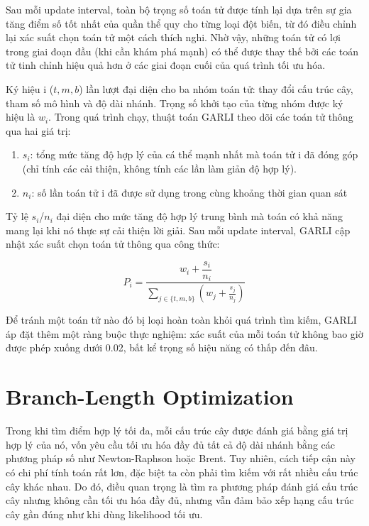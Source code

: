 \documentclass[12pt,a4paper]{report}
\begin{document}
Sau mỗi update interval, toàn bộ trọng số toán tử được tính lại dựa trên sự gia tăng điểm số tốt nhất của quần thể quy cho từng loại đột biến, từ đó điều chỉnh lại xác suất chọn toán tử một cách thích nghi. Nhờ vậy, những toán tử có lợi trong giai đoạn đầu (khi cần khám phá mạnh) có thể được thay thế bởi các toán tử tinh chỉnh hiệu quả hơn ở các giai đoạn cuối của quá trình tối ưu hóa.

Ký hiệu i \in (\(t, m, b\)) lần lượt đại diện cho ba nhóm toán tử: thay đổi cấu trúc cây, tham số mô hình và độ dài nhánh. Trọng số khởi tạo của từng nhóm được ký hiệu là \(w_i\). Trong quá trình chạy, thuật toán GARLI theo dõi các toán tử thông qua hai giá trị:

\begin{enumerate}
    \item \(s_i\): tổng mức tăng độ hợp lý của cá thể mạnh nhất mà toán tử i đã đóng góp (chỉ tính các cải thiện, không tính các lần làm giản độ hợp lý).
    \item \(n_i\): số lần toán tử i đã được sử dụng trong cùng khoảng thời gian quan sát
\end{enumerate}
 
Tỷ lệ \(s_i\)/\(n_i\) đại diện cho mức tăng độ hợp lý trung bình mà toán có khả năng mang lại khi nó thực sự cải thiện lời giải. Sau mỗi update interval, GARLI cập nhật xác suất chọn toán tử thông qua công thức:

\begin{equation}
    P_i = \frac{w_i + \dfrac{s_i}{n_i}}{\displaystyle \sum_{j \in \{t,m,b\}} \left( w_j + \frac{s_j}{n_j} \right)}
    \label{eq:placeholder_label}
\end{equation}

Để tránh một toán tử nào đó bị loại hoàn toàn khỏi quá trình tìm kiếm, GARLI áp đặt thêm một ràng buộc thực nghiệm: xác suất của mỗi toán tử không bao giờ được phép xuống dưới 0.02, bất kể trọng số hiệu năng có thấp đến đâu.

\section{Branch-Length Optimization}

Trong khi tìm điểm hợp lý tối đa, mỗi cấu trúc cây được đánh giá bằng giá trị hợp lý của nó, vốn yêu cầu tối ưu hóa đầy đủ tất cả độ dài nhánh bằng các phương pháp số như Newton-Raphson hoặc Brent. Tuy nhiên, cách tiếp cận này có chi phí tính toán rất lơn, đặc biệt ta còn phải tìm kiếm với rất nhiều cấu trúc cây khác nhau. Do đó, điều quan trọng là tìm ra phương pháp đánh giá cấu trúc cây nhưng không cần tối ưu hóa đầy đủ, nhưng vẫn đảm bảo xếp hạng cấu trúc cây gần đúng như khi dùng likelihood tối ưu.
\end{document}
